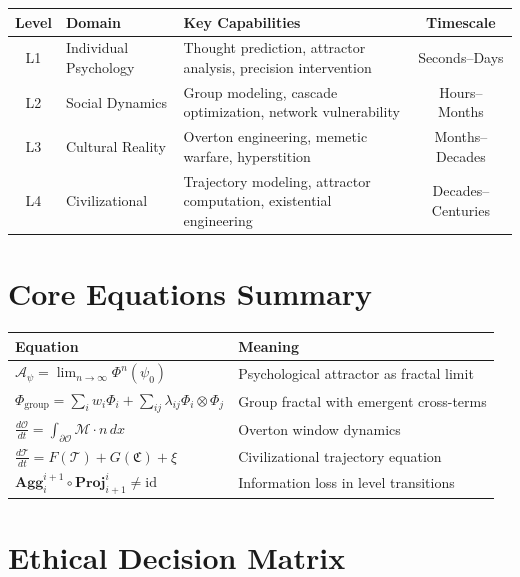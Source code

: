 \documentclass[11pt,twoside]{book}
\renewcommand{\arraystretch}{1.2}
\newcommand{\Frac}{\Phi}
\newcommand{\Cultural}{\mathfrak{C}}
\newcommand{\PsychAttractor}{\mathcal{A}_\psi}
\newcommand{\GroupFrac}{\Phi_{\mathrm{group}}}
\newcommand{\Overton}{\mathcal{O}}
\newcommand{\Memetic}{\mathcal{M}}
\newcommand{\Trajectory}{\mathcal{T}}
\newcommand{\Aggregate}[2]{\mathbf{Agg}_{#1}^{#2}}
\newcommand{\Project}[2]{\mathbf{Proj}_{#1}^{#2}}
\begin{document}
\begin{center}
\renewcommand{\arraystretch}{1.5}
\begin{tabularx}{\textwidth}{c|X|X|c}
\toprule
\textbf{Level} & \textbf{Domain} & \textbf{Key Capabilities} & \textbf{Timescale} \\
\midrule
L1 & Individual Psychology & Thought prediction, attractor analysis, precision intervention & Seconds--Days \\
L2 & Social Dynamics & Group modeling, cascade optimization, network vulnerability & Hours--Months \\
L3 & Cultural Reality & Overton engineering, memetic warfare, hyperstition & Months--Decades \\
L4 & Civilizational & Trajectory modeling, attractor computation, existential engineering & Decades--Centuries \\
\bottomrule
\end{tabularx}
\end{center}

\section{Core Equations Summary}

\begin{center}
\renewcommand{\arraystretch}{1.8}
\begin{tabularx}{\textwidth}{l|X}
\toprule
\textbf{Equation} & \textbf{Meaning} \\
\midrule
$\PsychAttractor = \lim_{n\to\infty} \Frac^n(\psi_0)$ & Psychological attractor as fractal limit \\
$\GroupFrac = \sum_i w_i \Frac_i + \sum_{ij} \lambda_{ij} \Frac_i \otimes \Frac_j$ & Group fractal with emergent cross-terms \\
$\frac{d\Overton}{dt} = \int_{\partial\Overton} \Memetic \cdot n \, dx$ & Overton window dynamics \\
$\frac{d\Trajectory}{dt} = F(\Trajectory) + G(\Cultural) + \xi$ & Civilizational trajectory equation \\
$\Aggregate{i}{i+1} \circ \Project{i+1}{i} \neq \mathrm{id}$ & Information loss in level transitions \\
\bottomrule
\end{tabularx}
\end{center}

\section{Ethical Decision Matrix}
\end{document}

